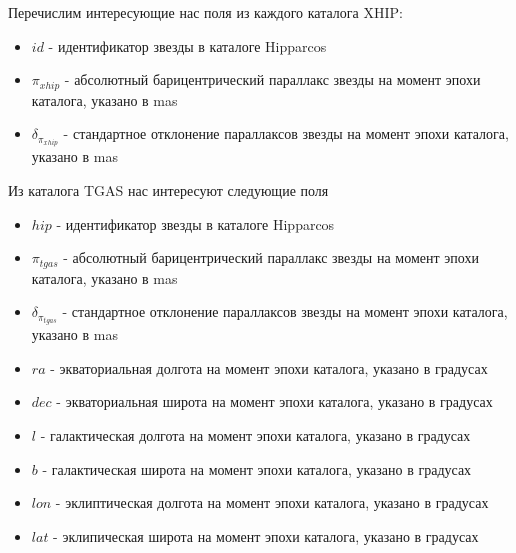 \documentclass[14pt]{article} %
\begin{document}
Перечислим интересующие нас поля из каждого каталога XHIP:

\begin{itemize}

\item $id$ - идентификатор звезды в каталоге Hipparcos

\item $\pi_{xhip}$ - абсолютный барицентрический параллакс звезды на момент эпохи каталога, указано в mas

\item $\delta_{\pi_{xhip}}$ - стандартное отклонение параллаксов звезды на момент эпохи каталога, указано в mas

\end{itemize}

Из каталога TGAS нас интересуют следующие поля

\begin{itemize}

\item $hip$ - идентификатор звезды в каталоге Hipparcos

\item $\pi_{tgas}$ - абсолютный барицентрический параллакс звезды на момент эпохи каталога, указано в mas

\item $\delta_{\pi_{tgas}}$ - стандартное отклонение параллаксов звезды на момент эпохи каталога, указано в mas

\item $ra$ - экваториальная долгота на момент эпохи каталога, указано в градусах

\item $dec$ - экваториальная широта на момент эпохи каталога, указано в градусах

\item $l$ - галактическая долгота на момент эпохи каталога, указано в градусах

\item $b$ - галактическая широта на момент эпохи каталога, указано в градусах

\item $lon$ - эклиптическая долгота на момент эпохи каталога, указано в градусах

\item $lat$ - эклипическая широта на момент эпохи каталога, указано в градусах

\end{itemize}
\end{document}
